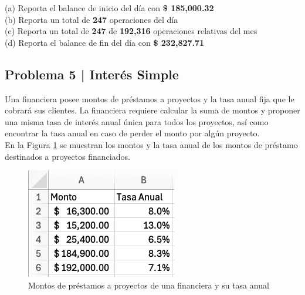 \documentclass{article}
\begin{document}
\noindent
(a) Reporta el balance de inicio del día con \textbf{\$ 185,000.32}
\\[6pt]
(b) Reporta un total de \textbf{247} operaciones del día
\\[6pt]
(c) Reporta un total de \textbf{247} de \textbf{192,316} operaciones relativas del mes
\\[6pt]
(d) Reporta el balance de fin del día con \textbf{\$ 232,827.71}
\\[6pt]

\subsection*{Problema 5 | Interés Simple}

Una financiera posee montos de préstamos a proyectos y la tasa anual fija que le cobrará sus clientes. La financiera requiere calcular la suma de montos y proponer una misma tasa de interés anual única para todos los proyectos, así como encontrar la tasa anual en caso de perder el monto por algún proyecto.
\\[12pt]
En la Figura \ref{fig:p105} se muestran los montos y la tasa anual de los montos de préstamo destinados a proyectos financiados.
\begin{figure}[!ht]
    \centering
    \begin{minipage}{\textwidth}
        \centering
        \includegraphics[width=\textwidth]{figures/p105.png}
    \end{minipage}
    \captionsetup{width=0.9\textwidth}
    \caption{Montos de préstamos a proyectos de una financiera y su tasa anual}
    \label{fig:p105}
\end{figure}
\\
\end{document}

